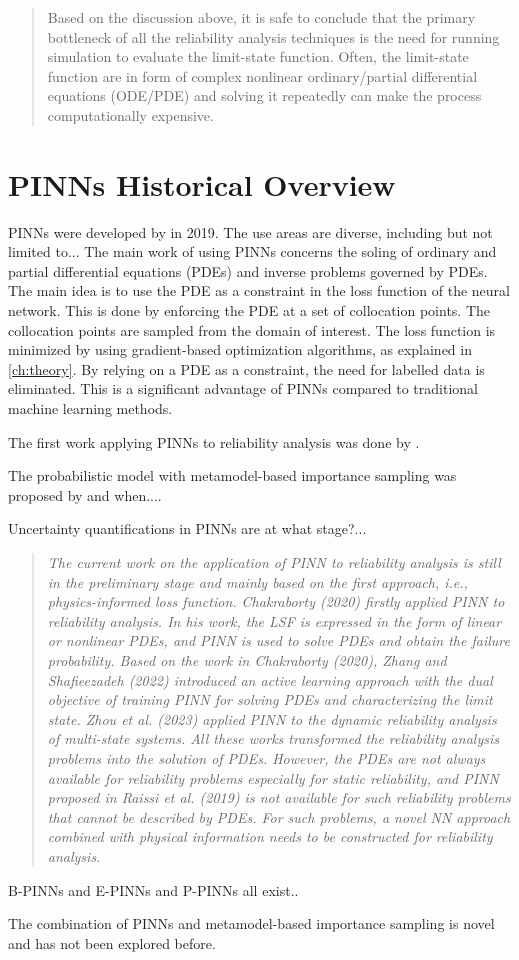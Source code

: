\begin{quotation}
    Based on the discussion above, it is safe to conclude that the primary bottleneck of all the reliability analysis techniques is the need for running simulation to evaluate the limit-state function. Often, the limit-state function are in form of complex nonlinear ordinary/partial differential equations (ODE/PDE) and solving it repeatedly can make the process computationally expensive. \citep{chakraborty2020simulationfreereliabilityanalysis}
\end{quotation}


\section{PINNs Historical Overview}
\label{sec:historical-overview}

PINNs were developed by \cite{raissi2019pinns} in 2019. The use areas are diverse, including but not limited to...
The main work of using PINNs concerns the soling of ordinary and partial differential equations (PDEs) and inverse problems governed by PDEs. The main idea is to use the PDE as a constraint in the loss function of the neural network. This is done by enforcing the PDE at a set of collocation points. The collocation points are sampled from the domain of interest. The loss function is minimized by using gradient-based optimization algorithms, as explained in \ref{ch:theory}. By relying on a PDE as a constraint, the need for labelled data is eliminated. This is a significant advantage of PINNs compared to traditional machine learning methods. 

The first work applying PINNs to reliability analysis was done by \citet{chakraborty2020simulationfreereliabilityanalysis}. 

The probabilistic model with metamodel-based importance sampling was proposed by and when....

Uncertainty quantifications in PINNs are at what stage?...
\begin{quotation}
    \textit{The current work on the application of PINN to reliability analysis is still in the preliminary stage and mainly based on the first approach, i.e., physics-informed loss function. Chakraborty (2020) firstly applied PINN to reliability analysis. In his work, the LSF is expressed in the form of linear or nonlinear PDEs, and PINN is used to solve PDEs and obtain the failure probability. Based on the work in Chakraborty (2020), Zhang and Shafieezadeh (2022) introduced an active learning approach with the dual objective of training PINN for solving PDEs and characterizing the limit state. Zhou et al. (2023) applied PINN to the dynamic reliability analysis of multi-state systems. All these works transformed the reliability analysis problems into the solution of PDEs. However, the PDEs are not always available for reliability problems especially for static reliability, and PINN proposed in Raissi et al. (2019) is not available for such reliability problems that cannot be described by PDEs. For such problems, a novel NN approach combined with physical information needs to be constructed for reliability analysis.} 
    \cite{bai2023reliability}
\end{quotation}



B-PINNs and E-PINNs and P-PINNs all exist..

The combination of PINNs and metamodel-based importance sampling is novel and has not been explored before. 

